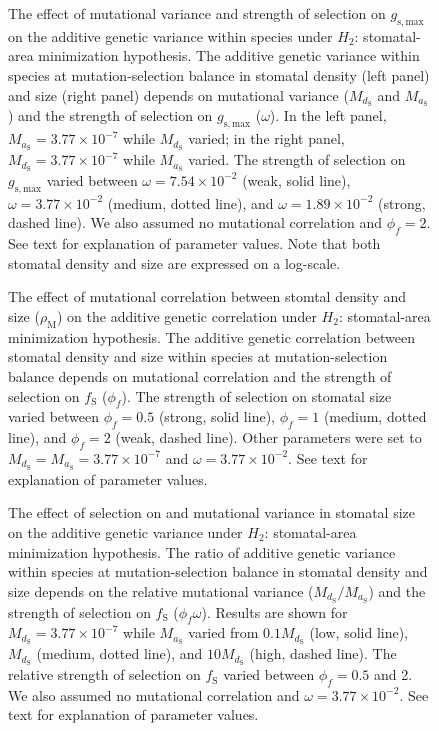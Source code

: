 \documentclass[
  letterpaper,
  DIV=11,
  numbers=noendperiod]{scrartcl}
\begin{document}
\newpage

\begin{figure}
\caption{The effect of mutational variance and strength of selection on $g_\mathrm{s,max}$ on the additive genetic variance within species under $H_2$: stomatal-area minimization hypothesis. The additive genetic variance within species at mutation-selection balance in stomatal density (left panel) and size (right panel) depends on mutational variance ($M_{d_\mathrm{S}}$ and $M_{a_\mathrm{S}}$) and the strength of selection on $g_\mathrm{s,max}$ ($\omega$). In the left panel, $M_{a_\mathrm{S}} = 3.77 \times 10^{-7}$ while $M_{d_\mathrm{S}}$ varied; in the right panel, $M_{d_\mathrm{S}} = 3.77 \times 10^{-7}$ while $M_{a_\mathrm{S}}$ varied. The strength of selection on $g_\mathrm{s,max}$ varied between $\omega = 7.54 \times 10^{-2}$ (weak, solid line), $\omega = 3.77 \times 10^{-2}$ (medium, dotted line), and $\omega = 1.89 \times 10^{-2}$ (strong, dashed line). We also assumed no mutational correlation and $\phi_f = 2$. See text for explanation of parameter values. Note that both stomatal density and size are expressed on a log-scale.}

\end{figure}

\newpage

\begin{figure}
\caption{The effect of mutational correlation between stomtal density and size ($\rho_\mathrm{M}$) on the additive genetic correlation under $H_2$: stomatal-area minimization hypothesis. The additive genetic correlation between stomatal density and size within species at mutation-selection balance depends on mutational correlation and the strength of selection on $f_\mathrm{S}$ ($\phi_f$). The strength of selection on stomatal size varied between $\phi_f = 0.5$ (strong, solid line), $\phi_f = 1$ (medium, dotted line), and $\phi_f = 2$ (weak, dashed line). Other parameters were set to $M_{d_\mathrm{S}} = M_{a_\mathrm{S}} = 3.77 \times 10^{-7}$ and $\omega = 3.77 \times 10^{-2}$. See text for explanation of parameter values.}

\end{figure}

\newpage

\begin{figure}
\caption{The effect of selection on and mutational variance in stomatal size on the additive genetic variance under $H_2$: stomatal-area minimization hypothesis. The ratio of additive genetic variance within species at mutation-selection balance in stomatal density and size depends on the relative mutational variance ($M_{d_\mathrm{S}} / M_{a_\mathrm{S}}$) and the strength of selection on $f_\mathrm{S}$ ($\phi_f \omega$). Results are shown for $M_{d_\mathrm{S}} = 3.77 \times 10^{-7}$ while $M_{a_\mathrm{S}}$ varied from $0.1 M_{d_\mathrm{S}}$ (low, solid line), $M_{d_\mathrm{S}}$ (medium, dotted line), and $10 M_{d_\mathrm{S}}$ (high, dashed line). The relative strength of selection on $f_\mathrm{S}$ varied between $\phi_f = 0.5$ and 2. We also assumed no mutational correlation and $\omega = 3.77 \times 10^{-2}$. See text for explanation of parameter values.}

\end{figure}
\end{document}
